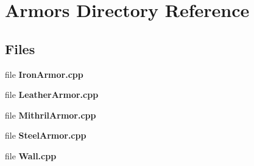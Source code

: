 \section{Armors Directory Reference}
\label{dir_0ff7efae5f5f5788a8d5ba20dd949619}
\subsection*{Files}
\begin{DoxyCompactItemize}
\item 
file {\bf Iron\-Armor.\-cpp}
\item 
file {\bf Leather\-Armor.\-cpp}
\item 
file {\bf Mithril\-Armor.\-cpp}
\item 
file {\bf Steel\-Armor.\-cpp}
\item 
file {\bf Wall.\-cpp}
\end{DoxyCompactItemize}
